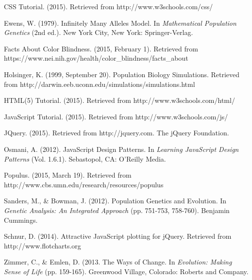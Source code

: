 \documentclass[12pt]{article}
\begin{document}
\begin{spacing}{1.5}
\begin{thebibliography}{9}
CSS Tutorial. (2015). Retrieved from http://www.w3schools.com/css/

Ewens, W. (1979). Infinitely Many Alleles Model. In \textit{Mathematical Population Genetics} (2nd ed.). New York City, New York: Springer-Verlag.

Facts About Color Blindness. (2015, February 1). Retrieved from https://www.nei.nih.gov/health/color\_blindness/facts\_about

Holsinger, K. (1999, September 20). Population Biology Simulations. Retrieved from http://darwin.eeb.uconn.edu/simulations/simulations.html

HTML(5) Tutorial. (2015). Retrieved from http://www.w3schools.com/html/

JavaScript Tutorial. (2015). Retrieved from http://www.w3schools.com/js/

JQuery. (2015). Retrieved from http://jquery.com. The jQuery Foundation.

Osmani, A. (2012). JavaScript Design Patterns. In \textit{Learning JavaScript Design Patterns} (Vol. 1.6.1). Sebastopol, CA: O'Reilly Media.

Populus. (2015, March 19). Retrieved from http://www.cbs.umn.edu/research/resources/populus

Sanders, M., \& Bowman, J. (2012). Population Genetics and Evolution. In \textit{Genetic Analysis: An Integrated Approach} (pp. 751-753, 758-760). Benjamin Cummings.

Schnur, D. (2014). Attractive JavaScript plotting for jQuery. Retrieved from http://www.flotcharts.org

Zimmer, C., \& Emlen, D. (2013. The Ways of Change. In \textit{Evolution: Making Sense of Life} (pp. 159-165). Greenwood Village, Colorado: Roberts and Company.

\end{thebibliography}

\end{spacing}
\end{document}
